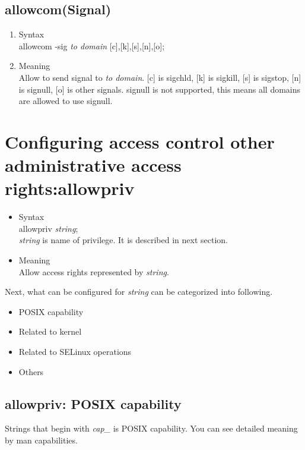 \documentclass{article}
\begin{document}
\subsection{allowcom(Signal)}
\begin{enumerate}
 \item Syntax\\
       allowcom -sig {\it to domain} [c],[k],[s],[n],[o];
 \item Meaning\\
       Allow to send signal to {\it to domain}. [c] is sigchld, [k] is
       sigkill, [s] is sigstop, [n] is signull, [o] is other signals. signull is not
       supported, this means all domains are allowed to use signull.
\end{enumerate}



\section{Configuring access control other administrative access
  rights:allowpriv}
\begin{itemize}
 \item Syntax \\
       allowpriv {\it string};\\
       {\it string} is name  of privilege. It is described in next section.
 \item Meaning \\
       Allow access rights represented by        {\it string}.
\end{itemize}
Next, 
what can be configured for {\it string} can be categorized into
following.
\begin{itemize}
 \item POSIX capability\\
 \item Related to kernel\\
 \item Related to SELinux operations\\
 \item Others
\end{itemize}


\subsection{allowpriv: POSIX capability}
Strings that begin with {\it cap\_} is POSIX capability. You can see
detailed meaning by man capabilities.
\end{document}
